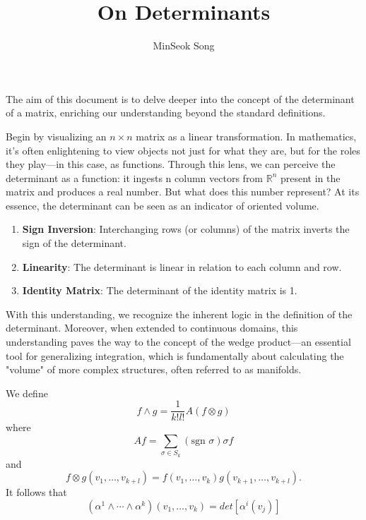 \documentclass{article}
\title{On Determinants}
\author{MinSeok Song}
\date{}
\theoremstyle{remark}
\begin{document}
\maketitle

The aim of this document is to delve deeper into the concept of the determinant of a matrix, enriching our understanding beyond the standard definitions.

Begin by visualizing an $n\times n$ matrix as a linear transformation. In mathematics, it's often enlightening to 
view objects not just for what they are, but for the roles they play—in this case, as functions. Through this lens, we can perceive the determinant as a function: it ingests
n column vectors from $\mathbb{R}^n$ present in the matrix and 
produces a real number. But what does this number represent? At its essence, the determinant 
can be seen as an indicator of oriented volume.
  \begin{enumerate}
  \item \textbf{Sign Inversion}: Interchanging rows (or columns) of the matrix inverts the sign of the determinant.
  \item \textbf{Linearity}: The determinant is linear in relation to each column and row.
  \item \textbf{Identity Matrix}: The determinant of the identity matrix is 1.
  \end{enumerate}

  With this understanding, we recognize the inherent logic in the definition
   of the determinant. Moreover, when extended to continuous domains, this understanding paves the way to the concept of the wedge product—an 
   essential tool for generalizing integration, which is fundamentally about calculating the 
   "volume" of more complex structures, often referred to as manifolds.


We define $$f\wedge g=\frac 1{k!l!}A(f\otimes g)$$ where
$$Af=\sum_{\sigma\in S_k}(\text{sgn } \sigma)\sigma f$$ and $$f\otimes g(v_1,\dots,v_{k+l})=f(v_1,\dots,v_k)g(v_{k+1},\dots,v_{k+l}).$$
  It follows that $$(\alpha^1\wedge\cdots\wedge \alpha^k)(v_1,\dots, v_k)=det[\alpha^i(v_j)]$$
\end{document}
